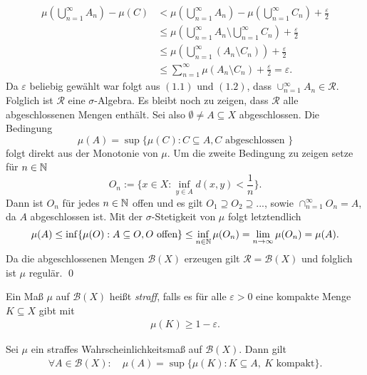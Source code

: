 \begin{proof*}
    \begin{align}
        \mu(\bigcup_{n=1}^{\infty}A_n) - \mu(C) &< \mu(\bigcup_{n=1}^{\infty}A_n) - \mu(\bigcup_{n=1}^{\infty}C_n) + \frac{\varepsilon}{2} \nonumber \\\
                                                &\leq \mu(\bigcup_{n=1}^{\infty}A_n \setminus \bigcup_{n=1}^{\infty}C_n)  + \frac{\varepsilon}{2} \nonumber \\\
                                                &\leq \mu(\bigcup_{n=1}^{\infty}(A_n \setminus C_n)) + \frac{\varepsilon}{2} \nonumber \\\
                                                &\leq \sum_{n=1}^{\infty}\mu(A_n \setminus C_n) + \frac{\varepsilon}{2} = \varepsilon. 
    \end{align}
    Da $\varepsilon$ beliebig gewählt war folgt aus $(1.1)$ und $(1.2)$, dass $\cup_{n=1}^{\infty}A_n \in \mathcal{R}$. Folglich ist $\mathcal{R}$ eine $\sigma$-Algebra. 
    Es bleibt noch zu zeigen, dass $\mathcal{R}$ alle abgeschlossenen Mengen enthält. Sei also $\emptyset \neq A \subseteq X$ abgeschlossen. Die Bedingung 
    $$
        \mu(A) = \sup\{\mu(C): C \subseteq A, C\text{ abgeschlossen }\}
    $$
    folgt direkt aus der Monotonie von $\mu$. Um die zweite Bedingung zu zeigen setze für $n \in \mathbb{N}$
    $$
        O_n := \big\{x \in X: \inf_{y \in  A}d(x,y) < \frac{1}{n}\big\}.
    $$
    Dann ist $O_n$ für jedes $n \in \mathbb{N}$ offen und es gilt $O_1 \supseteq O_2 \supseteq ...$, sowie $\cap_{n=1}^{\infty}O_n = A$, da $A$ abgeschlossen ist. 
    Mit der $\sigma$-Stetigkeit von $\mu$ folgt letztendlich 
    $$
        \mu(A) \leq \inf\{\mu(O): A \subseteq O, O \text{ offen}\} \leq \inf_{n \in \mathbb{N}}\mu(O_n) = \lim_{n \to \infty}\mu(O_n) = \mu(A). 
    $$
    Da die abgeschlossenen Mengen $\mathcal{B}(X)$ erzeugen gilt $\mathcal{R} = \mathcal{B}(X)$ und folglich ist $\mu$ regulär. \qed
\end{proof*}
\begin{mydef}
    Ein Maß $\mu$ auf $\mathcal{B}(X)$ heißt \textit{straff}, falls es für alle $\varepsilon > 0$ eine kompakte Menge $K \subseteq X$ gibt mit 
    \begin{align*}
        \mu(K) \geq 1 - \varepsilon. 
    \end{align*}

\end{mydef}

\begin{corollary}
    Sei $\mu$ ein straffes Wahrscheinlichkeitsmaß auf $\mathcal{B}(X)$. Dann gilt
    \begin{align*}
        \forall A \in \mathcal{B}(X): \quad \mu(A) = \sup\{\mu(K): K \subseteq A,\ K \text{ kompakt}\}. 
    \end{align*}
\end{corollary}

